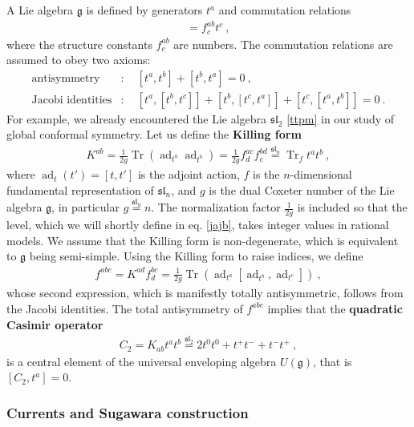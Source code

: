 \documentclass[12pt, a4paper, notitlepage, twoside]{report}
\numberwithin{equation}{section}
\theoremstyle{break}
\begin{document}
A Lie algebra $\mathfrak{g}$ is defined by generators $t^a$ and commutation relations 
\begin{align}
 [t^a,t^b] = f^{ab}_c t^c \ ,
\label{ttft}
\end{align}
where the structure constants $f^{ab}_c$ are numbers.
The commutation relations are assumed to obey two axioms:
\begin{align}
 \text{antisymmetry} & : \quad [t^a,t^b] + [t^b,t^a] = 0\ ,
\\
\text{Jacobi identities} & : \quad  [t^a,[t^b,t^c]] + [t^b,[t^c,t^a]] + [t^c,[t^a,t^b]] = 0 \ .
\end{align}
For example, we already encountered the Lie algebra $\mathfrak{sl}_2$ \eqref{ttpm} in our study of global conformal symmetry.
Let us define the \textbf{\boldmath Killing form} 
\begin{align}
 K^{ab} = \frac{1}{2g} \operatorname{Tr} \left(\operatorname{ad}_{t^a}\operatorname{ad}_{t^b}\right) =\frac{1}{2g} f^{ac}_d f^{bd}_c \overset{\mathfrak{sl}_n}{=}\operatorname{Tr}_f t^at^b\ ,
\end{align}
where  $\operatorname{ad}_t(t') = [t,t']$ is the adjoint action, $f$ is the $n$-dimensional fundamental representation of $\mathfrak{sl}_n$, and $g$ is the dual Coxeter number of the Lie algebra $\mathfrak{g}$, in particular $g\overset{\mathfrak{sl}_n}{=}n$.
The normalization factor $\frac{1}{2g}$ is included so that the level, which we will shortly define in eq. \eqref{jajb}, takes integer values in rational models.
We assume that the Killing form is non-degenerate, which is equivalent to $\mathfrak{g}$ being semi-simple. 
Using the Killing form to raise indices, we define
\begin{align}
 f^{abc} = K^{ad}f_d^{bc} = \frac{1}{2g}\operatorname{Tr}\left( \operatorname{ad}_{t^a} [\operatorname{ad}_{t^b}, \operatorname{ad}_{t^c}] \right)\ ,
\end{align}
whose second expression, which is manifestly totally antisymmetric, follows from the Jacobi identities.
The total antisymmetry of $f^{abc}$ implies that the \textbf{\boldmath quadratic Casimir operator}
\begin{align}
 C_2 = K_{ab} t^a t^b \overset{\mathfrak{sl}_2}{=} 2t^0t^0+ t^+t^-+t^-t^+\ ,
\label{ctk}
\end{align}
is a central element of the universal enveloping algebra $U(\mathfrak{g})$, that is $[C_2,t^a]=0$.

\subsubsection{Currents and Sugawara construction}
\end{document}
